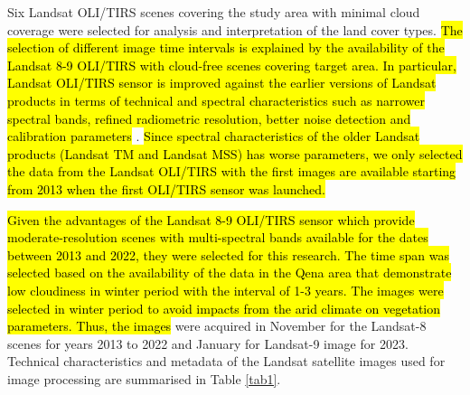 \documentclass[information,article,submit,pdftex,moreauthors]{Definitions/mdpi}
\begin{document}
Six Landsat OLI/TIRS scenes covering the study area with minimal cloud coverage were selected for analysis and interpretation of the land cover types. \hl{The selection of different image time intervals is explained by the availability of the Landsat 8-9 OLI/TIRS with cloud-free scenes covering target area. In particular, Landsat OLI/TIRS sensor is improved against the earlier versions of Landsat products in terms of technical and spectral characteristics such as narrower spectral bands, refined radiometric resolution, better noise detection and calibration parameters} \cite{IRONS201211}. \hl{Since spectral characteristics of the older Landsat products (Landsat TM and Landsat MSS) has worse parameters, we only selected the data from the Landsat OLI/TIRS with the first images are available starting from 2013 when the first OLI/TIRS sensor was launched.} 

\hl{Given the advantages of the Landsat 8-9 OLI/TIRS sensor which provide moderate-resolution scenes with multi-spectral bands available for the dates between 2013 and 2022, they were selected for this research. The time span was selected based on the availability of the data in the Qena area that demonstrate low cloudiness in winter period with the interval of 1-3 years. The images were selected in winter period to avoid impacts from the arid climate on vegetation parameters. Thus, the images} were acquired in November for the Landsat-8 scenes for years 2013 to 2022 and January for Landsat-9 image for 2023. Technical characteristics and metadata of the Landsat satellite images used for image processing are summarised in Table \ref{tab1}. 
\end{document}
